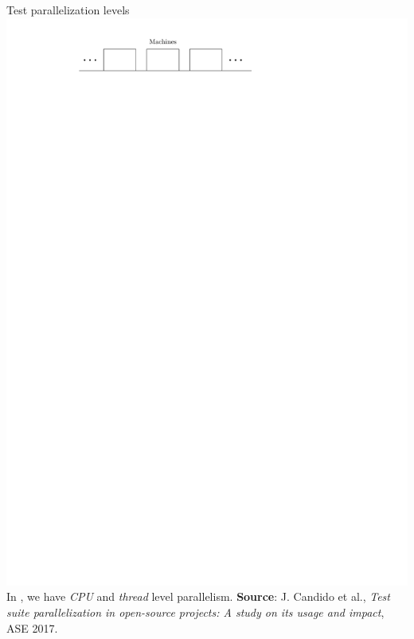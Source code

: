 \documentclass{beamer}
\begin{document}
\begin{frame}{Test parallelization levels}
	\centering
	\includegraphics[width=\linewidth,page=1]{images/intro.pdf}
	\vfill
	{\color{white}In \tname{}, we have \textit{CPU} and \textit{thread} level parallelism.}
	\vfill
	{\fontsize{4}{4}\selectfont\textbf{Source}: J. Candido et al., \textit{Test suite parallelization in open-source projects: A study on its usage and impact}, ASE 2017.}
\end{frame}
\end{document}
